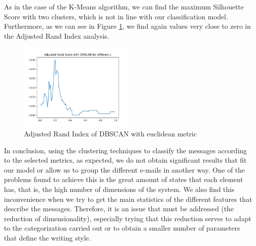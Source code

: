 As in the case of the K-Means algorithm, we can find the maximum Silhouette Score with two clusters, which is not in line with our classification model. Furthermore, as we can see in Figure \ref{fig:dbscanari}, we find again values very close to zero in the Adjusted Rand Index analysis.

\begin{figure}
	\centering%
	\centerline{\includegraphics[width=0.5\textwidth]{Imagenes/Bitmap/Clustering/dbscanari.png}}%
	\caption{Adjusted Rand Index of DBSCAN with euclidean metric}%
	\label{fig:dbscanari}
\end{figure}

In conclusion, using the clustering techniques to classify the messages according to the selected metrics, as expected, we do not obtain significant results that fit our model or allow us to group the different e-mails in another way. One of the problems found to achieve this is the great amount of states that each element has, that is, the high number of dimensions of the system. We also find this inconvenience when we try to get the main statistics of the different features that describe the messages. Therefore, it is an issue that must be addressed (the reduction of dimensionality), especially trying that this reduction serves to adapt to the categorization carried out or to obtain a smaller number of parameters that define the writing style.